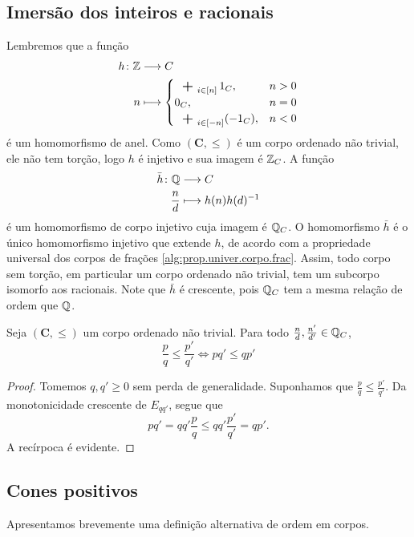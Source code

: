 \subsection{Imersão dos inteiros e racionais}

Lembremos que a função
	\begin{align*}
	\func{h}{\Z}{C}{n}{
		\begin{cases}
			\sum_{i \in [n]} 1_C,& n>0 \\
			0_C,& n=0 \\
			\sum_{i \in [-n]} (-1_C),& n<0
		\end{cases}
	}
	\end{align*}
é um homomorfismo de anel. Como $(\bm C,\leq)$ é um corpo ordenado não trivial, ele não tem torção, logo $h$ é injetivo e sua imagem é $\mathbb{Z}_C$. A função
	\begin{align*}
	{\bar h}\colon {\mathbb{Q}} &\longrightarrow {C} \\{\frac{n}{d}} &\longmapsto h(n)h(d)^{-1}
	\end{align*}
é um homomorfismo de corpo injetivo cuja imagem é $\mathbb{Q}_C$. O homomorfismo $\bar h$ é o único homomorfismo injetivo que extende $h$, de acordo com a propriedade universal dos corpos de frações \ref{alg:prop.univer.corpo.frac}. Assim, todo corpo sem torção, em particular um corpo ordenado não trivial, tem um subcorpo isomorfo aos racionais. 	Note que $\bar h$ é crescente, pois $\mathbb{Q}_C$ tem a mesma relação de ordem que $\mathbb{Q}$.

\begin{proposition}
Seja $(\bm C,\leq)$ um corpo ordenado não trivial. Para todo $\frac{n}{d},\frac{n'}{d'} \in \mathbb{Q}_C$,
	\begin{equation*}
	\frac{p}{q} \leq \frac{p'}{q'} \Leftrightarrow pq' \leq qp'
	\end{equation*}
\end{proposition}
\begin{proof}
Tomemos $q,q' \geq 0$ sem perda de generalidade. Suponhamos que $\frac{p}{q} \leq \frac{p'}{q'}$. Da monotonicidade crescente de $E_{qq'}$, segue que
	\begin{equation*}
	pq' = qq'\frac{p}{q} \leq qq'\frac{p'}{q'} = qp'.
	\end{equation*}
A recírpoca é evidente.
\end{proof}


\subsection{Cones positivos}

Apresentamos brevemente uma definição alternativa de ordem em corpos.

